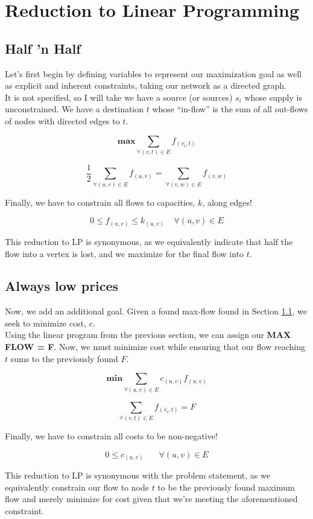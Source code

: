 \documentclass[conference]{styles/acmsiggraph}
\newcommand{\?}{\stackrel{?}{=}}
\DeclareRobustCommand{\mybox}[2][gray!20]{%
\begin{tcolorbox}[   %
        breakable,
        left=0pt,
        right=0pt,
        top=0pt,
        bottom=0pt,
        colback=#1,
        colframe=#1,
        width=\dimexpr\textwidth\relax, 
        enlarge left by=0mm,
        boxsep=5pt,
        arc=0pt,outer arc=0pt,
        ]
        #2
\end{tcolorbox}
}
\begin{document}
\newpage


\section{Reduction to Linear Programming}
\subsection{Half 'n Half} \label{section:4a}
Let's first begin by defining variables to represent our maximization goal as well as explicit and inherent constraints, taking our network as a directed graph.\\

It is not specified, so I will take we have a source (or sources) $s_i$ whose supply is unconstrained.  We have a destination $t$ whose \enquote{in-flow} is the sum of all out-flows of nodes with directed edges to $t$.

\mybox{
$$\textbf{max} \sum_{\forall (v,t) \in E} f_{(v_i,t)}$$

$$\frac{1}{2} \sum_{\forall (u,v) \in E}f_{(u,v)} = \sum_{\forall (v,w) \in E}f_{(v,w)}$$
}

Finally, we have to constrain all flows to capacities, $k$, along edges!
\mybox{
$$0 \leq f_{(u,v)} \leq k_{(u,v)}\ \ \ \ \ \forall (u,v) \in E$$
}
This reduction to LP is synonymous, as we equivalently indicate that half the flow into a vertex is lost, and we maximize for the final flow into $t$.





\subsection{Always low prices}
Now, we add an additional goal.  Given a found max-flow found in Section \ref{section:4a}, we seek to minimize cost, $c$.\\

Using the linear program from the previous section, we can assign our \textbf{MAX FLOW = F}.  Now, we must minimize cost while ensuring that our flow reaching $t$ sums to the previously found $F$.

\mybox{
$$\textbf{min}\sum_{\forall (u,v) \in E}c_{(u,v)}f_{(u,v)}$$

$$\sum_{\forall (v,t) \in E} f_{(v_i,t)} = F$$

}

Finally, we have to constrain all costs to be non-negative!
\mybox{
$$0 \leq c_{(u,v)}\ \ \ \ \ \ \ \ \forall (u,v) \in E$$
}
This reduction to LP is synonymous with the problem statement, as we equivalently constrain our flow to node $t$ to be the previously found maximum flow and merely minimize for cost given that we're meeting the aforementioned constraint.
\end{document}
